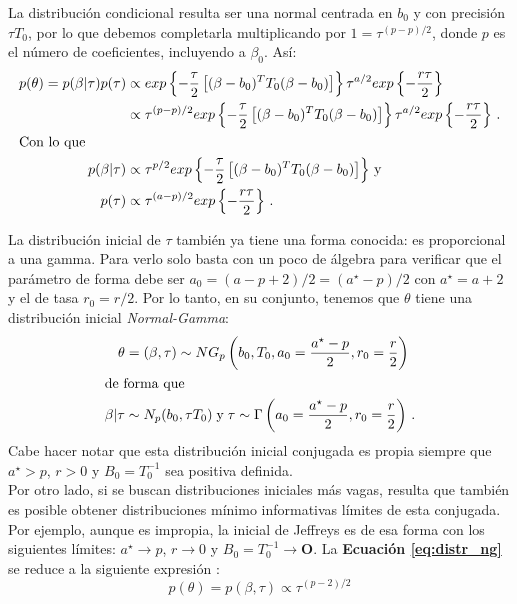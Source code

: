 La distribución condicional resulta ser una normal centrada en $b_0$ y con precisión $\tau T_0$, por lo que debemos completarla multiplicando por $1=\tau^{(p-p)/2}$, donde $p$ es el número de coeficientes, incluyendo a $\beta_0$. Así: 
\begin{align} \label{eq:distr_ng}
p(\theta)= p(\beta|\tau)p(\tau) &\propto exp\left\lbrace -\dfrac{\tau}{2}\left[(\beta-b_0)^TT_0(\beta-b_0)\right] \right\rbrace \tau^{a/2} exp\left\lbrace -\dfrac{r\tau}{2}\right\rbrace \nonumber \\
&\propto \tau^{(p - p)/2} exp\left\lbrace -\dfrac{\tau}{2}\left[(\beta-b_0)^TT_0(\beta-b_0)\right] \right\rbrace \tau^{a/2} exp\left\lbrace -\dfrac{r\tau}{2}\right\rbrace \,. \nonumber\\
\intertext{Con lo que} \nonumber 
p(\beta|\tau) &\propto \tau^{p/2} exp\left\lbrace -\dfrac{\tau}{2}\left[(\beta-b_0)^TT_0(\beta-b_0)\right] \right\rbrace \,\text{y} \nonumber \\
p(\tau) &\propto \tau^{(a-p)/2} exp\left\lbrace -\dfrac{r\tau}{2}\right\rbrace \,.
\end{align}

La distribución inicial de $\tau$ también ya tiene una forma conocida: es proporcional a una gamma. Para verlo solo basta con un poco de álgebra para verificar que el parámetro de forma debe ser $a_0 = (a-p+2)/2=(a^\star-p)/2$ con $a^\star=a+2$ y el de tasa $r_0 = r/2$. Por lo tanto, en su conjunto, tenemos que $\theta$ tiene una distribución inicial \textit{Normal-Gamma}: 
\begin{align} 
\theta &= (\beta,\tau) \sim NG_p\left(b_0,T_0,a_0=\dfrac{a^\star-p}{2},r_0 =\dfrac{r}{2}\right) \nonumber \\
\intertext{de forma que}
\beta|\tau &\sim N_p(b_0,\tau T_0) \;\text{y}\; \tau \sim \Gamma\left(a_0 = \dfrac{a^\star-p}{2}, r_0 = \dfrac{r}{2}\right) \,.
\label{eq:normal_gamma}
\end{align}
Cabe hacer notar que esta distribución inicial conjugada es propia siempre que $a^\star > p $, $r > 0$ y $B_0 = T_0^{-1}$ sea positiva definida.\\ 

Por otro lado, si se buscan distribuciones iniciales más vagas, resulta que también es posible obtener distribuciones mínimo informativas límites de esta conjugada. Por ejemplo, aunque es impropia, la inicial de Jeffreys es de esa forma con los siguientes límites: $a^\star \rightarrow p $, $r \rightarrow 0$ y $B_0 = T_0^{-1} \rightarrow \mathbf{O}$. La \textbf{Ecuación \ref{eq:distr_ng}} se reduce a la siguiente expresión \parencite[14]{GP}: 
\begin{equation} \label{eq:jeffreys_ng}
p(\theta) = p(\beta,\tau) \propto \tau^{(p-2)/2}
\end{equation}

